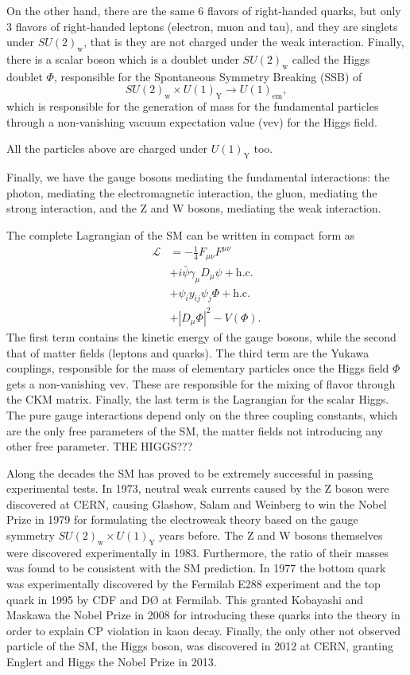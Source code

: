 On the other hand, there are the same 6 flavors of right-handed quarks, but only 3 flavors of right-handed leptons (electron, muon and tau), and they are singlets under $SU(2)_{\textrm{w}}$, that is they are not charged under the weak interaction. Finally, there is a scalar boson which is a doublet under $SU(2)_{\textrm{w}}$ called the Higgs doublet $\Phi$, responsible for the Spontaneous Symmetry Breaking (SSB) of
\begin{equation}
SU(2)_{\textrm{w}}\times U(1)_{\textrm{Y}}\to U(1)_{\textrm{em}},
\end{equation}
which is responsible for the generation of mass for the fundamental particles through a non-vanishing vacuum expectation value (vev) for the Higgs field. 

All the particles above are charged under $U(1)_{\textrm{Y}}$ too. 

Finally, we have the gauge bosons mediating the fundamental interactions: the photon, mediating the electromagnetic interaction, the gluon, mediating the strong interaction, and the Z and W bosons, mediating the weak interaction.

The complete Lagrangian of the SM can be written in compact form as
\begin{align}
\mathcal{L}&=-\frac{1}{4}F_{\mu\nu}F^{\mu\nu}\\
&+i\bar{\psi}\gamma_{\mu}D_{\mu}\psi+\textrm{h.c.}\\
&+\psi_iy_{ij}\psi_j\Phi+\textrm{h.c.}\\
&+|D_{\mu}\Phi|^2-V(\Phi).
\end{align}
The first term contains the kinetic energy of the gauge bosons, while the second that of matter fields (leptons and quarks). The third term are the Yukawa couplings, responsible for the mass of elementary particles once the Higgs field $\Phi$ gets a non-vanishing vev. These are responsible for the mixing of flavor through the CKM matrix. Finally, the last term is the Lagrangian for the scalar Higgs. The pure gauge interactions depend only on the three coupling constants, which are the only free parameters of the SM, the matter fields not introducing any other free parameter. THE HIGGS???

Along the decades the SM has proved to be extremely successful in passing experimental tests. In 1973, neutral weak currents caused by the Z boson were discovered at CERN, causing Glashow, Salam and Weinberg to win the Nobel Prize in 1979 for formulating the electroweak theory based on the gauge symmetry $SU(2)_{\textrm{w}}\times U(1)_{\textrm{Y}}$ years before. The Z and W bosons themselves were discovered experimentally in 1983. Furthermore, the ratio of their masses was found to be consistent with the SM prediction. In 1977 the bottom quark was experimentally discovered by the Fermilab E288 experiment and the top quark in 1995 by CDF and DØ at Fermilab. This granted Kobayashi and Maskawa the Nobel Prize in 2008 for introducing these quarks into the theory in order to explain CP violation in kaon decay. Finally, the only other not observed particle of the SM, the Higgs boson, was discovered in 2012 at CERN, granting Englert and Higgs the Nobel Prize in 2013.

